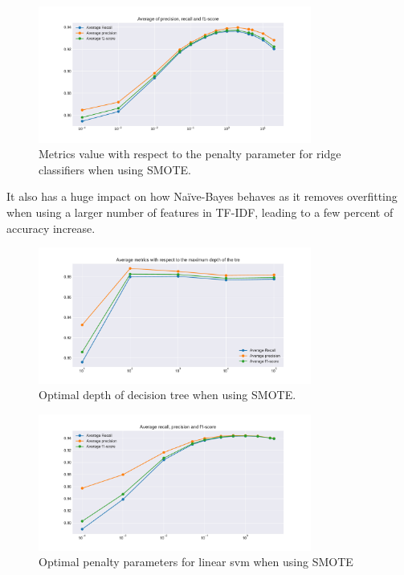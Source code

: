 \begin{figure}
 \centering
 \includegraphics[width=0.8\textwidth]{images/chapitre3/ridge+smote}
 \caption{Metrics value with respect to the penalty parameter for ridge classifiers when using SMOTE.}
 \label{fig:chap3:ridge3}
\end{figure}
It also has a huge impact on how Na\"{i}ve-Bayes behaves as it removes overfitting when using a larger number of features in TF-IDF, leading to a few percent of accuracy increase. \\
\begin{figure}
 \centering
 \includegraphics[width=0.8\textwidth]{images/chapitre3/fake-dt-SMOTE}
 \caption{Optimal depth of decision tree when using SMOTE.}
 \label{fig:chap3:dt3}
\end{figure}
\begin{figure}
 \centering
 \includegraphics[width=0.8\textwidth]{images/chapitre3/svc_fake_smote}
 \caption{Optimal penalty parameters for linear svm when using SMOTE}
 \label{fig:chap3:lsvm3}
\end{figure}

